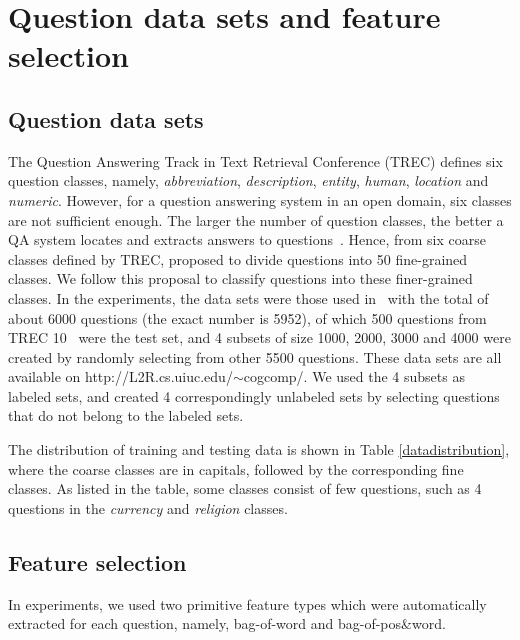 \documentclass[english]{jnlp_1.4}
\begin{document}
\section{Question data sets and feature selection}

\vspace{-0.5\baselineskip}
\subsection{Question data sets}

The Question Answering Track in Text Retrieval Conference \pagebreak
(TREC)
\cite{Voorhees1999,Voorhees2000,Voorhees2001} defines six question
classes, namely, \emph{abbreviation}, \emph{description},
\emph{entity}, \emph{human}, \emph{location} and \emph{numeric}.
However, for a question answering system in an open domain, six
classes are not sufficient enough. The larger the number of
question classes, the better a QA system locates and extracts
answers to questions~\cite{Li02}. Hence, from six coarse classes
defined by TREC, \cite{Li02} proposed to divide questions into 50
fine-grained classes. We follow this proposal to classify
questions into these finer-grained classes. In the experiments,
the data sets were those used in~\cite{Li02} with the total of
about 6000 questions (the exact number is 5952), of which 500
questions from TREC 10~\cite{Voorhees2001} were the test set, and
4 subsets of size 1000, 2000, 3000 and 4000 were created by
randomly selecting from other 5500 questions. These data sets are
all available on http://L2R.cs.uiuc.edu/$\sim$cogcomp/. We used
the 4 subsets as labeled sets, and created 4 correspondingly
unlabeled sets by selecting questions that do not belong to the
labeled sets.

The distribution of training and testing data is shown in Table \ref{datadistribution}, where the coarse classes are in capitals, followed by the corresponding fine classes. As listed in the table, some classes consist of few questions, such as 4 questions in the \emph{currency} and \emph{religion} classes.


\subsection{Feature selection}

In experiments, we used two primitive feature types which were
automatically extracted for each question, namely, bag-of-word and
bag-of-pos\&word.
\end{document}
